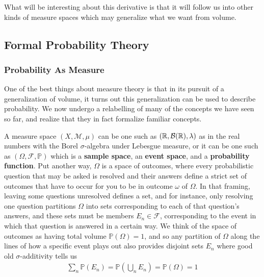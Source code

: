 \documentclass[11pt]{article}
\begin{document}
What will be interesting about this derivative is that it will follow us into other kinds of measure spaces which may generalize what we want from volume.

\subsection{Formal Probability Theory}

\subsubsection{Probability As Measure}

One of the best things about measure theory is that in its pursuit of a generalization of volume, it turns out this generalization can be used to describe probability. We now undergo a relabelling of many of the concepts we have seen so far, and realize that they in fact formalize familiar concepts.

A measure space $(X,\mathcal M, \mu)$ can be one such as $(\mathbb{R}, \mathcal B(\mathbb{R}), \lambda)$ as in the real numbers with the Borel $\sigma$-algebra under Lebesgue measure, or it can be one such as $(\Omega, \mathcal F, \mathbb{P})$ which is a \textbf{sample space}, an \textbf{event space}, and a \textbf{probability function}. Put another way, $\Omega$ is a space of outcomes, where every probabilistic question that may be asked is resolved and their answers define a strict set of outcomes that have to occur for you to be in outcome $\omega$ of $\Omega$. In that framing, leaving some questions unresolved defines a set, and for instance, only resolving one question partitions $\Omega$ into sets corresponding to each of that question's answers, and these sets must be members $E_n \in \mathcal F$, corresponding to the event in which that question is answered in a certain way. We think of the space of outcomes as having total volume $\mathbb{P}(\Omega) = 1$, and so any partition of $\Omega$ along the lines of how a specific event plays out also provides disjoint sets $E_n$ where good old $\sigma$-additivity tells us \begin{gather*}
\sum_n \mathbb{P}(E_n) = \mathbb{P}\left( \bigcup_n E_n \right) = \mathbb{P}(\Omega) = 1
\end{gather*}
\end{document}
